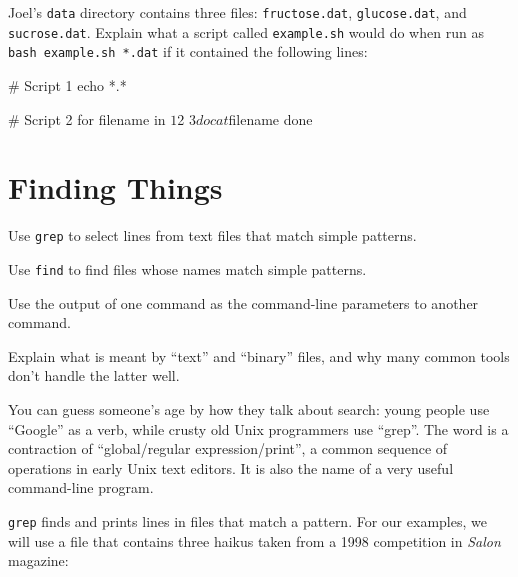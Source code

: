 \documentclass{book}
\begin{document}
\begin{challenge}
  Joel's \texttt{data} directory contains three files:
  \texttt{fructose.dat}, \texttt{glucose.dat}, and \texttt{sucrose.dat}.
  Explain what a script called \texttt{example.sh} would do when run as
  \texttt{bash example.sh *.dat} if it contained the following lines:

\begin{VerbFile}
# Script 1
echo *.*
\end{VerbFile}

\begin{VerbFile}
# Script 2
for filename in $1 $2 $3
do
    cat $filename
done
\end{VerbFile}


\end{challenge}

\section{Finding Things}

\begin{objectives}
\begin{swcitemize}
\item
  Use \texttt{grep} to select lines from text files that match simple
  patterns.
\item
  Use \texttt{find} to find files whose names match simple patterns.
\item
  Use the output of one command as the command-line parameters to
  another command.
\item
  Explain what is meant by ``text'' and ``binary'' files, and why many
  common tools don't handle the latter well.
\end{swcitemize}
\end{objectives}

You can guess someone's age by how they talk about search: young people
use ``Google'' as a verb, while crusty old Unix programmers use
``grep''. The word is a contraction of ``global/regular
expression/print'', a common sequence of operations in early Unix text
editors. It is also the name of a very useful command-line program.

\texttt{grep} finds and prints lines in files that match a pattern. For
our examples, we will use a file that contains three haikus taken from a
1998 competition in \emph{Salon} magazine:
\end{document}
